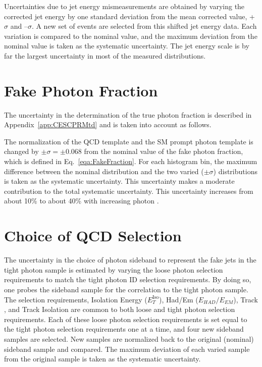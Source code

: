 Uncertainties due to jet energy mismeasurements are obtained by varying the corrected jet energy by one standard deviation from the mean corrected value, \mbox{+$\sigma$} and \mbox{--$\sigma$}. A new set of events are selected from this shifted jet energy data. Each variation is compared to the nominal value, and the  maximum deviation from the nominal value is taken as the systematic uncertainty. The jet energy scale is by far the largest uncertainty in most of the measured distributions.

\section{Fake Photon Fraction}
The uncertainty in the determination of the true photon fraction is described in Appendix~\ref{app:CESCPRMtd} and is taken into account as follows.

The normalization of the QCD template and the SM prompt photon template is changed by $\pm\sigma = \pm 0.068$ from the nominal value of the fake photon fraction, which is defined in Eq.~\ref{eqa:FakeFraction}. For each histogram bin, the maximum difference between the nominal distribution and the two varied ($\pm \sigma$) distributions is taken as the systematic uncertainty. This uncertainty makes a moderate contribution to the total systematic uncertainty. This uncertainty increases from about 10\% to about 40\% with increasing photon \et.

\section{Choice of QCD Selection}
The uncertainty in the choice of photon sideband to represent the fake jets in the tight photon sample is estimated by varying the loose photon selection requirements to match the tight photon ID selection requirements. By doing so, one probes the sideband sample for the correlation to the tight photon sample. The selection requirements, Isolation Energy ($E_{T}^{\mathrm{Iso}}$), Had/Em ($E_{HAD}/E_{EM}$), Track \pt, and Track Isolation are common to both loose and tight photon selection requirements. Each of these loose photon selection requirements is set equal to the tight photon selection requirements one at a time, and four new sideband samples are selected. New samples are normalized back to the original (nominal) sideband sample and compared. The maximum deviation of each varied sample from the original sample is taken as the systematic uncertainty.

